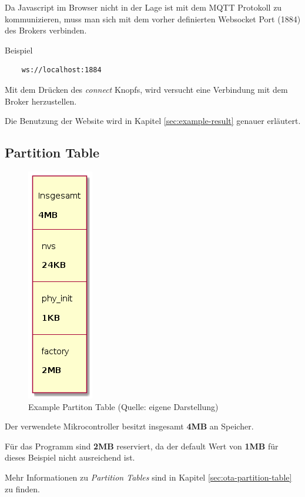 Da Javascript im Browser nicht in der Lage ist mit dem MQTT Protokoll zu kommunizieren, muss man sich mit dem vorher definierten Websocket Port (1884) des Brokers verbinden.

Beispiel
\begin{verbatim}
    ws://localhost:1884
\end{verbatim}

Mit dem Drücken des \textit{connect} Knopfs, wird versucht eine Verbindung mit dem Broker herzustellen.

Die Benutzung der Website wird in Kapitel \ref{sec:example-result} genauer erläutert.

\subsection{Partition Table}

\begin{figure}[H]
    \begin{center}
        \includegraphics[scale=.6]{diagrams/mqtt_dht22_example_partitions.png}
        \caption{Example Partiton Table (Quelle: eigene Darstellung)}
        \label{abb:example-partitions}
    \end{center}
\end{figure}

Der verwendete Mikrocontroller besitzt insgesamt \textbf{4MB} an Speicher.

Für das Programm sind \textbf{2MB} reserviert, da der default Wert von \textbf{1MB} für dieses Beispiel nicht ausreichend ist. 

Mehr Informationen zu \textit{Partition Tables} sind in Kapitel \ref{sec:ota-partition-table} zu finden.

